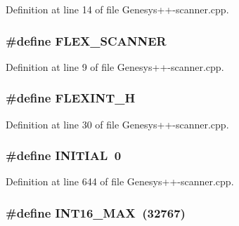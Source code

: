 Definition at line 14 of file Genesys++-\/scanner.\-cpp.

\hypertarget{_genesys_09_09-scanner_8cpp_a3c3d1ef92e93b0bc81d7760a73d5c3b6}{
\subsubsection[{F\-L\-E\-X\-\_\-\-S\-C\-A\-N\-N\-E\-R}]{\setlength{\rightskip}{0pt plus 5cm}\#define F\-L\-E\-X\-\_\-\-S\-C\-A\-N\-N\-E\-R}}\label{_genesys_09_09-scanner_8cpp_a3c3d1ef92e93b0bc81d7760a73d5c3b6}


Definition at line 9 of file Genesys++-\/scanner.\-cpp.

\hypertarget{_genesys_09_09-scanner_8cpp_aec980b5a71bbe6d67931df20f0ebaec4}{
\subsubsection[{F\-L\-E\-X\-I\-N\-T\-\_\-\-H}]{\setlength{\rightskip}{0pt plus 5cm}\#define F\-L\-E\-X\-I\-N\-T\-\_\-\-H}}\label{_genesys_09_09-scanner_8cpp_aec980b5a71bbe6d67931df20f0ebaec4}


Definition at line 30 of file Genesys++-\/scanner.\-cpp.

\hypertarget{_genesys_09_09-scanner_8cpp_aa3d063564f6ab16f6d408b8369d0e9ff}{
\subsubsection[{I\-N\-I\-T\-I\-A\-L}]{\setlength{\rightskip}{0pt plus 5cm}\#define I\-N\-I\-T\-I\-A\-L~0}}\label{_genesys_09_09-scanner_8cpp_aa3d063564f6ab16f6d408b8369d0e9ff}


Definition at line 644 of file Genesys++-\/scanner.\-cpp.

\hypertarget{_genesys_09_09-scanner_8cpp_ac58f2c111cc9989c86db2a7dc4fd84ca}{
\subsubsection[{I\-N\-T16\-\_\-\-M\-A\-X}]{\setlength{\rightskip}{0pt plus 5cm}\#define I\-N\-T16\-\_\-\-M\-A\-X~(32767)}}\label{_genesys_09_09-scanner_8cpp_ac58f2c111cc9989c86db2a7dc4fd84ca}


